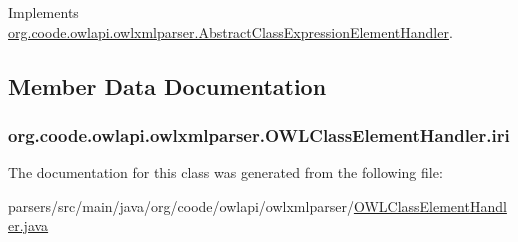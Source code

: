 Implements \hyperlink{classorg_1_1coode_1_1owlapi_1_1owlxmlparser_1_1_abstract_class_expression_element_handler_a0812d9b8ccf8f81054bd9dda4e0d7403}{org.\-coode.\-owlapi.\-owlxmlparser.\-Abstract\-Class\-Expression\-Element\-Handler}.



\subsection{Member Data Documentation}
\hypertarget{classorg_1_1coode_1_1owlapi_1_1owlxmlparser_1_1_o_w_l_class_element_handler_a3c1521da2b0fb040aed56499e521bc98}{
\subsubsection[{iri}]{ org.\-coode.\-owlapi.\-owlxmlparser.\-O\-W\-L\-Class\-Element\-Handler.\-iri\hspace{0.3cm}{\ttfamily [private]}}}\label{classorg_1_1coode_1_1owlapi_1_1owlxmlparser_1_1_o_w_l_class_element_handler_a3c1521da2b0fb040aed56499e521bc98}


The documentation for this class was generated from the following file\-:\begin{DoxyCompactItemize}
\item 
parsers/src/main/java/org/coode/owlapi/owlxmlparser/\hyperlink{_o_w_l_class_element_handler_8java}{O\-W\-L\-Class\-Element\-Handler.\-java}\end{DoxyCompactItemize}
